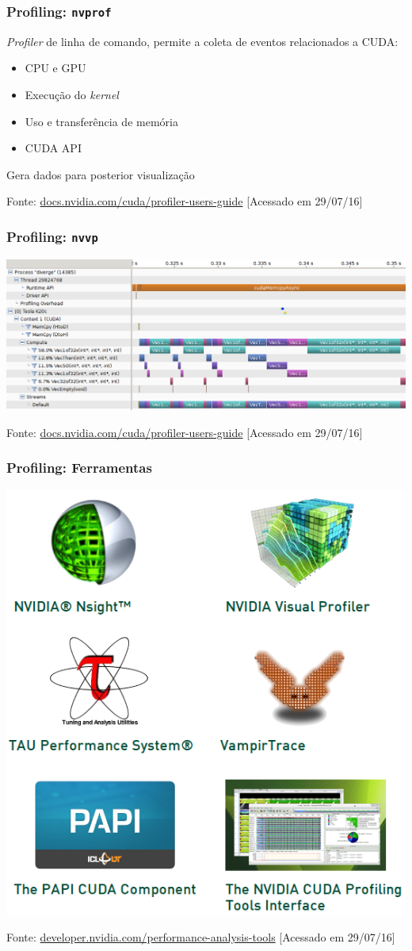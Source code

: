 \documentclass[10pt, compress]{beamer}
\begin{document}
\begin{frame}
    \frametitle{Profiling: \texttt{nvprof}}
    \textit{Profiler} de \alert{linha de comando},
    permite a coleta de eventos relacionados a CUDA:
    \pause
    \begin{itemize}
        \item CPU e GPU
            \pause
        \item Execução do \textit{kernel}
            \pause
        \item Uso e transferência de memória
            \pause
        \item CUDA API
    \end{itemize}
    \pause

    Gera dados para \alert{posterior visualização}

    \begin{center}
        \tiny{Fonte: \url{docs.nvidia.com/cuda/profiler-users-guide} [Acessado em 29/07/16]}
    \end{center}
\end{frame}

\begin{frame}
    \frametitle{Profiling: \texttt{nvvp}}
    \centering
    \includegraphics[width=\textwidth]{nvvp}

    \vfill
    \tiny{Fonte: \url{docs.nvidia.com/cuda/profiler-users-guide} [Acessado em 29/07/16]}
\end{frame}

\begin{frame}
    \frametitle{Profiling: Ferramentas}
    \centering
    \includegraphics[width=.5\textwidth]{profile_tools}

    \vfill
    \tiny{Fonte: \url{developer.nvidia.com/performance-analysis-tools} [Acessado em 29/07/16]}
\end{frame}
\end{document}
